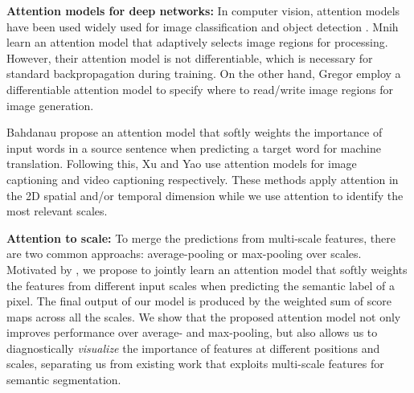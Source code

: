 \textbf{Attention models for deep networks:} In computer vision, attention models have been used widely used for image classification \cite{cao2015look, gregor2015draw, xiao2015application} and object detection \cite{ba2014multiple, caicedo2015active, yoo2015attentionnet}. Mnih \etal \cite{mnih2014recurrent} learn an attention model that adaptively selects image regions for processing. However, their attention model is not differentiable, which is necessary for standard backpropagation during training. On the other hand, Gregor \etal \cite{gregor2015draw} employ a differentiable attention model to specify where to read/write image regions for image generation. 

Bahdanau \etal \cite{bahdanau2014neural} propose an attention model that softly weights the importance of input words in a source sentence when predicting a target word for machine translation. Following this, Xu \etal \cite{xu2015show} and Yao \etal \cite{yao2015describing} use attention models for image captioning and video captioning respectively. These methods apply attention in the 2D spatial and/or temporal dimension while we use attention to identify the most relevant scales. 

\textbf{Attention to scale:} To merge the predictions from multi-scale features, there are two common approachs: average-pooling \cite{ciresan2012multi, dai2015boxsup} or max-pooling \cite{felzenszwalb2010object, papandreou2014untangling} over scales. Motivated by \cite{bahdanau2014neural}, we propose to jointly learn an attention model that softly weights the features from different input scales when predicting the semantic label of a pixel. The final output of our model is produced by the
weighted sum of score maps across all the scales. We show that the proposed attention model not only improves performance over average- and max-pooling, but also allows us to diagnostically {\it visualize} the importance of features at different positions and scales, separating us from existing work that exploits multi-scale features for semantic segmentation.
